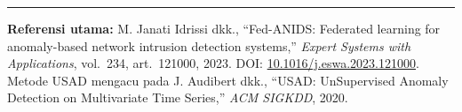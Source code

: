 \documentclass[11pt,a4paper]{article}
\begin{document}
\vspace{1em}
\hrule
\vspace{0.5em}
\noindent\footnotesize
\textbf{Referensi utama:} M. Janati Idrissi dkk., ``Fed-ANIDS: Federated
learning for anomaly-based network intrusion detection systems,''
\textit{Expert Systems with Applications}, vol.~234, art.~121000, 2023.
DOI: \href{https://doi.org/10.1016/j.eswa.2023.121000}{10.1016/j.eswa.2023.121000}.
Metode USAD mengacu pada J. Audibert dkk., ``USAD: UnSupervised Anomaly
Detection on Multivariate Time Series,'' \textit{ACM SIGKDD}, 2020.
\end{document}
